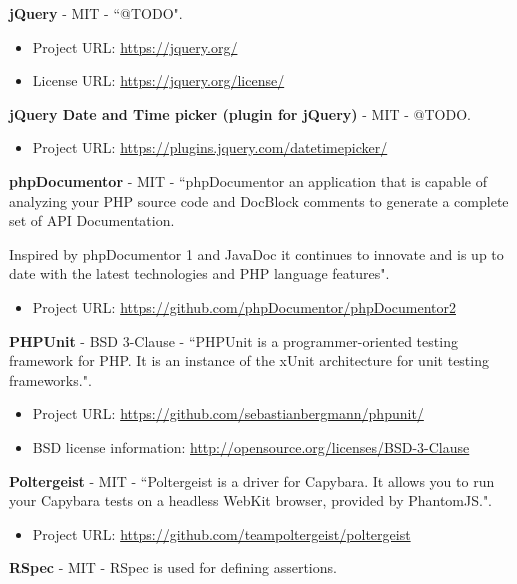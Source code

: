 \textbf{jQuery} - MIT - ``@TODO".

\begin{itemize}
\item Project URL: \url{https://jquery.org/}
\item License URL: \url{https://jquery.org/license/}
\end{itemize}

\textbf{jQuery Date and Time picker (plugin for jQuery)} - MIT - @TODO.

\begin{itemize}
\item Project URL: \url{https://plugins.jquery.com/datetimepicker/}
\end{itemize}

\textbf{phpDocumentor} - MIT - ``phpDocumentor an application that is capable of analyzing your PHP source code and DocBlock comments to generate a complete set of API Documentation.

Inspired by phpDocumentor 1 and JavaDoc it continues to innovate and is up to date with the latest technologies and PHP language features".

\begin{itemize}
\item Project URL: \url{https://github.com/phpDocumentor/phpDocumentor2}
\end{itemize}

\textbf{PHPUnit} - BSD 3-Clause - ``PHPUnit is a programmer-oriented testing framework for PHP. It is an instance of the xUnit architecture for unit testing frameworks.".

\begin{itemize}
\item Project URL: \url{https://github.com/sebastianbergmann/phpunit/}
\item BSD license information: \url{http://opensource.org/licenses/BSD-3-Clause}
\end{itemize}

\textbf{Poltergeist} - MIT - ``Poltergeist is a driver for Capybara. It allows you to run your Capybara tests on a headless WebKit browser, provided by PhantomJS.".

\begin{itemize}
\item Project URL: \url{https://github.com/teampoltergeist/poltergeist}
\end{itemize}

\textbf{RSpec} - MIT - RSpec is used for defining assertions.

